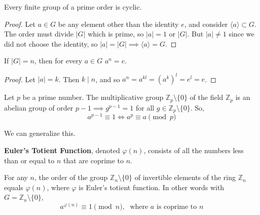   \begin{corollary}
    Every finite group of a prime order is cyclic. 
  \end{corollary}
  \begin{proof}
    Let $a \in G$ be any element other than the identity $e$, and consider $\langle a \rangle \subset G$. The order must divide $|G|$ which is prime, so $|a| = 1$ or $|G|$. But $|a| \neq 1$ since we did not choose the identity, so $|a| = |G| \implies \langle a \rangle = G$. 
  \end{proof}

  \begin{corollary}
    If $|G| = n$, then for every $a \in G$ $a^n = e$. 
  \end{corollary}
  \begin{proof}
    Let $|a| = k$. Then $k \mid n$, and so $a^n = a^{kl} = (a^k)^l = e^l = e$. 
  \end{proof}

  \begin{corollary}
    Let $p$ be a prime number. The multiplicative group $\mathbb{Z}_{p} \setminus \{0\}$ of the field $\mathbb{Z}_{p}$ is an abelian group of order $p-1 \implies g^{p-1} = 1$ for all $g \in \mathbb{Z}_{p} \setminus \{0\}$. So,
    \begin{equation}
      a^{p-1} \equiv 1 \iff a^{p} \equiv a \pmod{p}
    \end{equation}
  \end{corollary} 

  We can generalize this. 

  \begin{definition}
    \textbf{Euler's Totient Function}, denoted $\varphi(n)$, consists of all the numbers less than or equal to $n$ that are coprime to $n$. 
  \end{definition}

  \begin{theorem}
    For any $n$, the order of the group $\mathbb{Z}_{n} \setminus \{0\}$ of invertible elements of the ring $\mathbb{Z}_{n}$ equals $\varphi(n)$, where $\varphi$ is Euler's totient function. In other words with $G = \mathbb{Z}_{n} \setminus \{0\}$, 
    \begin{equation}
      a^{\varphi(n)} \equiv 1 \pmod{n}, \; \text{ where $a$ is coprime to $n$}
    \end{equation}
  \end{theorem}

